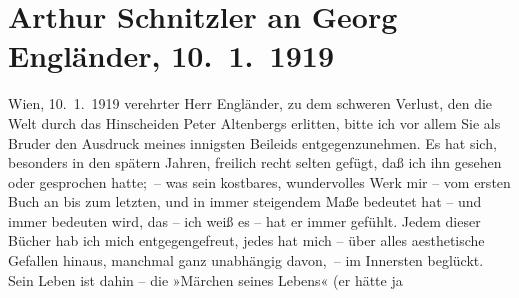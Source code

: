 

               \section[Arthur Schnitzler an Georg Engländer, 10. 1. 1919]{ Arthur Schnitzler an Georg Engländer, 10. 1. 1919}\nopagebreak{}\rehead{ }\begin{ledgroupsized}[t]{13cm}\normalsize\beginnumbering{} \toendnotes[C]{\smallbreak\pagebreak[2]} 
\toendnotes[C]{\smallbreak}\pstart
           \raggedleft{}{\pb}Wien, 10. 1. 1919\pend
           \pstart{}verehrter Herr Engländer,\pend\pstart
           zu dem schweren Verlust, den die Welt durch das Hinscheiden Peter Altenbergs erlitten, bitte ich vor allem Sie als
                    Bruder den Ausdruck meines innigsten Beileids entgegenzunehmen. Es hat sich,
                    besonders in den spätern Jahren, freilich recht selten gefügt, daß ich ihn
                    gesehen oder gesprochen hatte; – was sein kostbares, wundervolles Werk mir – vom
                    ersten Buch an bis zum letzten, und in immer
                    steigendem Maße bedeutet hat – und immer bedeuten wird, das – ich weiß es – hat
                    er immer gefühlt. Jedem dieser Bücher hab ich mich entgegengefreut, jedes hat
                    mich – über alles aesthetische Gefallen hinaus, manchmal ganz unabhängig
                    davon, – im Innersten beglückt. Sein Leben ist dahin – die »Märchen seines Lebens« (er hätte ja

\end{ledgroupsized}
